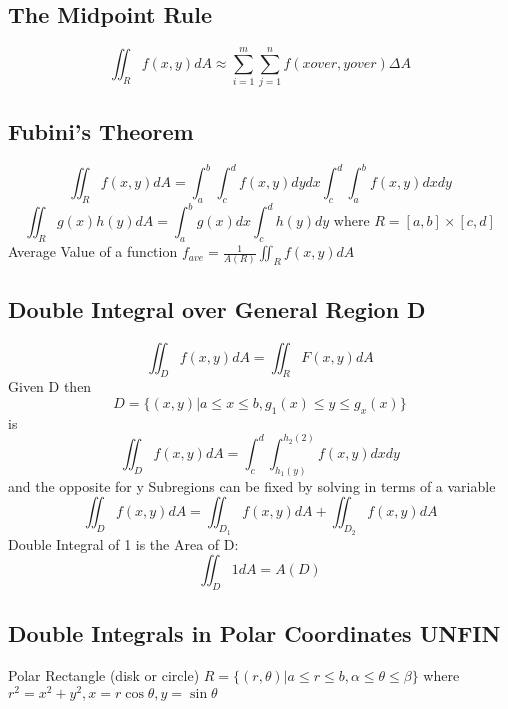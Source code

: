 \documentclass[12pt]{book}%
\begin{document}
\subsection{The Midpoint Rule}
\begin{equation}
    \iint_R f(x,y) dA \approx \sum_{i=1}^{m} \sum_{j=1}^{n} f(xover,yover)\Delta A
\end{equation}

\subsection{Fubini's Theorem}
\begin{equation}
    \iint_R f(x,y)dA= \int_{a}^{b} \int_{c}^{d} f(x,y) dydx \int_{c}^{d} \int_{a}^{b} f(x,y) dx dy
\end{equation}
\begin{equation}
    \iint_R g(x)h(y)dA = \int_{a}^{b}g(x)dx \int_{c}^{d}h(y)dy \text{ where } R=[a,b]\times[c,d]
\end{equation}
Average Value of a function
$f_{ave}= \frac{1}{A(R)} \iint_R f(x,y)dA$ 
\subsection{Double Integral over General Region D}
\begin{equation}
    \iint_D f(x,y)dA=\iint_R F(x,y)dA
\end{equation}
Given D then
\begin{equation}
    D= \{(x,y) | a\le x\le b,g_1(x)\le y\le g_x(x)\}
\end{equation}
is
\begin{equation}
    \iint_D f(x,y)dA = \int_{c}^{d} \int_{h_1(y)}^{h_2(2)} f(x,y) dx dy
\end{equation}
and the opposite for y
Subregions can be fixed by solving in terms of a variable
\begin{equation}
    \iint_D f(x,y)dA = \iint_{D_1} f(x,y)dA + \iint_{D_2} f(x,y)dA
\end{equation}
Double Integral of 1 is the Area of D:
\begin{equation}
    \iint_{D} 1dA=A(D)
\end{equation}
\subsection{Double Integrals in Polar Coordinates UNFIN}
Polar Rectangle (disk or circle)
$R=\{(r, \theta )|a\leq r\leq b,\alpha\leq \theta \leq\beta\}$  
where $r^2=x^2+y^2 ,x=r \cos \theta ,y = \sin \theta    $
\end{document}
